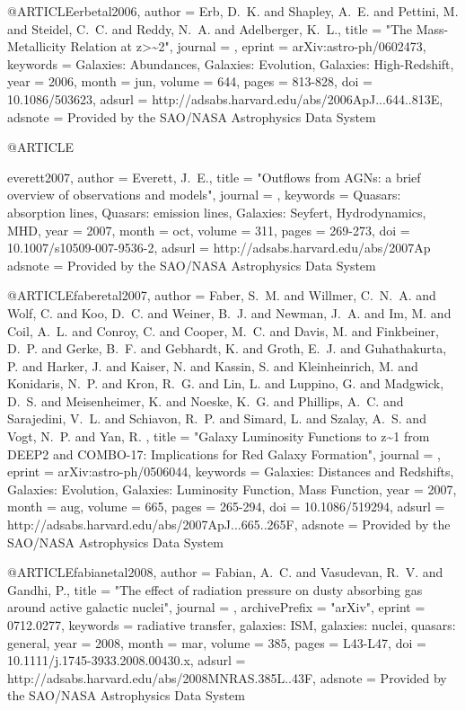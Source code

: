 {{{{{{{{{{{{{{{{@ARTICLE{erbetal2006,
   author = {{Erb}, D.~K. and {Shapley}, A.~E. and {Pettini}, M. and {Steidel}, C.~C. and 
	{Reddy}, N.~A. and {Adelberger}, K.~L.},
    title = "{The Mass-Metallicity Relation at z>\~{}2}",
  journal = {\apj},
   eprint = {arXiv:astro-ph/0602473},
 keywords = {Galaxies: Abundances, Galaxies: Evolution, Galaxies: High-Redshift},
     year = 2006,
    month = jun,
   volume = 644,
    pages = {813-828},
      doi = {10.1086/503623},
   adsurl = {http://adsabs.harvard.edu/abs/2006ApJ...644..813E},
  adsnote = {Provided by the SAO/NASA Astrophysics Data System}
}

@ARTICLE{everett2007,
   author = {{Everett}, J.~E.},
    title = "{Outflows from AGNs: a brief overview of observations and models}",
  journal = {\apss},
 keywords = {Quasars: absorption lines, Quasars: emission lines, Galaxies: Seyfert, Hydrodynamics, MHD},
     year = 2007,
    month = oct,
   volume = 311,
    pages = {269-273},
      doi = {10.1007/s10509-007-9536-2},
   adsurl = {http://adsabs.harvard.edu/abs/2007Ap%
  adsnote = {Provided by the SAO/NASA Astrophysics Data System}
}



@ARTICLE{faberetal2007,
   author = {{Faber}, S.~M. and {Willmer}, C.~N.~A. and {Wolf}, C. and {Koo}, D.~C. and 
	{Weiner}, B.~J. and {Newman}, J.~A. and {Im}, M. and {Coil}, A.~L. and 
	{Conroy}, C. and {Cooper}, M.~C. and {Davis}, M. and {Finkbeiner}, D.~P. and 
	{Gerke}, B.~F. and {Gebhardt}, K. and {Groth}, E.~J. and {Guhathakurta}, P. and 
	{Harker}, J. and {Kaiser}, N. and {Kassin}, S. and {Kleinheinrich}, M. and 
	{Konidaris}, N.~P. and {Kron}, R.~G. and {Lin}, L. and {Luppino}, G. and 
	{Madgwick}, D.~S. and {Meisenheimer}, K. and {Noeske}, K.~G. and 
	{Phillips}, A.~C. and {Sarajedini}, V.~L. and {Schiavon}, R.~P. and 
	{Simard}, L. and {Szalay}, A.~S. and {Vogt}, N.~P. and {Yan}, R.
	},
    title = "{Galaxy Luminosity Functions to z\~{}1 from DEEP2 and COMBO-17: Implications for Red Galaxy Formation}",
  journal = {\apj},
   eprint = {arXiv:astro-ph/0506044},
 keywords = {Galaxies: Distances and Redshifts, Galaxies: Evolution, Galaxies: Luminosity Function, Mass Function},
     year = 2007,
    month = aug,
   volume = 665,
    pages = {265-294},
      doi = {10.1086/519294},
   adsurl = {http://adsabs.harvard.edu/abs/2007ApJ...665..265F},
  adsnote = {Provided by the SAO/NASA Astrophysics Data System}
}

@ARTICLE{fabianetal2008,
   author = {{Fabian}, A.~C. and {Vasudevan}, R.~V. and {Gandhi}, P.},
    title = "{The effect of radiation pressure on dusty absorbing gas around active galactic nuclei}",
  journal = {\mnras},
archivePrefix = "arXiv",
   eprint = {0712.0277},
 keywords = {radiative transfer, galaxies: ISM, galaxies: nuclei, quasars: general},
     year = 2008,
    month = mar,
   volume = 385,
    pages = {L43-L47},
      doi = {10.1111/j.1745-3933.2008.00430.x},
   adsurl = {http://adsabs.harvard.edu/abs/2008MNRAS.385L..43F},
  adsnote = {Provided by the SAO/NASA Astrophysics Data System}
}


}}}}}}}}}}}}}}}}}
